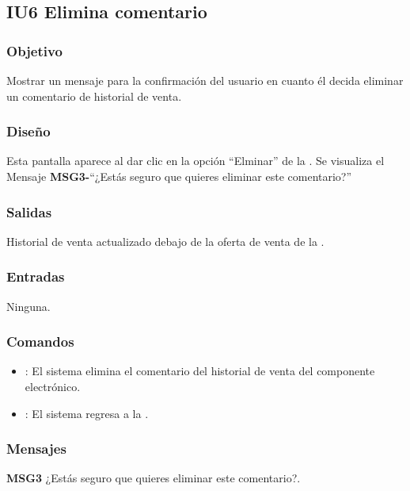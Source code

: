 \subsection{IU6 Elimina comentario}

\subsubsection{Objetivo}
    Mostrar un mensaje para la confirmación del usuario en cuanto él decida eliminar un comentario de historial de venta.
	
\subsubsection{Diseño}
	Esta pantalla aparece al dar clic en la opción ``Elminar'' de la . Se visualiza el Mensaje {\bf MSG3-}``¿Estás seguro que quieres eliminar este comentario?''


\subsubsection{Salidas}

	Historial de venta actualizado debajo de la oferta de venta de la .

\subsubsection{Entradas}
Ninguna.

\subsubsection{Comandos}
\begin{itemize}
	\item {}: El sistema elimina el comentario del historial de venta del componente electrónico.
	\item {}: El sistema regresa a la .
\end{itemize}

\subsubsection{Mensajes}
	\begin{Citemize}
		\item {\bf MSG3} ¿Estás seguro que quieres eliminar este comentario?.
	\end{Citemize}